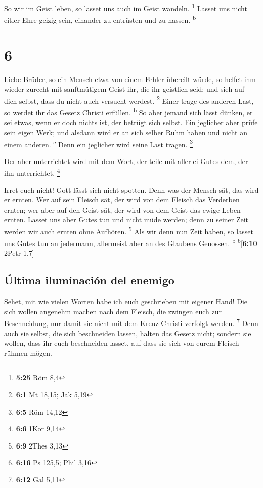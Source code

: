  So wir im Geist leben, so lasset uns auch im Geist
wandeln. \footnote{\textbf{5:25} Röm 8,4}  Lasset uns
nicht eitler Ehre geizig sein, einander zu entrüsten und zu hassen.
\textsuperscript{b}

\hypertarget{section-5}{%
\section{6}\label{section-5}}

 Liebe Brüder, so ein Mensch etwa von einem Fehler
übereilt würde, so helfet ihm wieder zurecht mit sanftmütigem Geist ihr,
die ihr geistlich seid; und sieh auf dich selbst, dass du nicht auch
versucht werdest. \footnote{\textbf{6:1} Mt 18,15; Jak 5,19}
 Einer trage des anderen Last, so werdet ihr das Gesetz
Christi erfüllen. \textsuperscript{b}  So aber jemand sich
lässt dünken, er sei etwas, wenn er doch nichts ist, der betrügt sich
selbst.  Ein jeglicher aber prüfe sein eigen Werk; und
alsdann wird er an sich selber Ruhm haben und nicht an einem anderen.
\textsuperscript{c}  Denn ein jeglicher wird seine Last
tragen. \footnote{\textbf{6:5} Röm 14,12}

 Der aber unterrichtet wird mit dem Wort, der teile mit
allerlei Gutes dem, der ihn unterrichtet. \footnote{\textbf{6:6} 1Kor
  9,14}

 Irret euch nicht! Gott lässt sich nicht spotten. Denn was
der Mensch sät, das wird er ernten.  Wer auf sein Fleisch
sät, der wird von dem Fleisch das Verderben ernten; wer aber auf den
Geist sät, der wird von dem Geist das ewige Leben ernten. 
Lasset uns aber Gutes tun und nicht müde werden; denn zu seiner Zeit
werden wir auch ernten ohne Aufhören. \footnote{\textbf{6:9} 2Thes 3,13}
 Als wir denn nun Zeit haben, so lasset uns Gutes tun an
jedermann, allermeist aber an des Glaubens Genossen. \textsuperscript{b}
\footnote{\textbf{6:16} Ps 125,5; Phil 3,16}{[}\textbf{6:10} 2Petr
1,7{]}

\hypertarget{uxfaltima-iluminaciuxf3n-del-enemigo}{%
\subsection{Última iluminación del
enemigo}\label{uxfaltima-iluminaciuxf3n-del-enemigo}}

 Sehet, mit wie vielen Worten habe ich euch geschrieben
mit eigener Hand!  Die sich wollen angenehm machen nach
dem Fleisch, die zwingen euch zur Beschneidung, nur damit sie nicht mit
dem Kreuz Christi verfolgt werden. \footnote{\textbf{6:12} Gal 5,11}
 Denn auch sie selbst, die sich beschneiden lassen,
halten das Gesetz nicht; sondern sie wollen, dass ihr euch beschneiden
lasset, auf dass sie sich von eurem Fleisch rühmen mögen.

